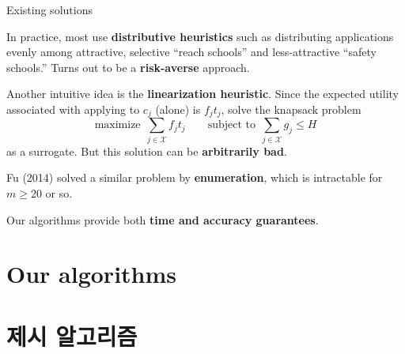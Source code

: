 \documentclass[11pt,slidestop,compress,mathserif,notheorems]{beamer}
\theoremstyle{definition}
\theoremstyle{definition}
\begin{document}
\begin{frame}{Existing solutions}

In practice, most use \textbf{distributive heuristics} such as distributing applications evenly among attractive, selective ``reach schools'' and less-attractive ``safety schools.'' Turns out to be a \textbf{risk-averse} approach.

Another intuitive idea is the \textbf{linearization heuristic}. Since the expected utility associated with applying to $c_j$ (alone) is $f_j t_j$, solve the knapsack problem
\[\text{maximize}~~\sum_{j\in \mathcal{X}} f_j t_j \qquad \text{subject to}~~\sum_{j\in \mathcal{X}}g_j \leq H \]
as a surrogate. But this solution can be \textbf{arbitrarily bad}. 

Fu (2014) solved a similar problem by \textbf{enumeration}, which is intractable for $m \geq 20$ or so.

Our algorithms provide both \textbf{time and accuracy guarantees}. 

\end{frame}














\ifen \section{Our algorithms} \else \section{제시 알고리즘} \fi

  \fi
\end{document}
